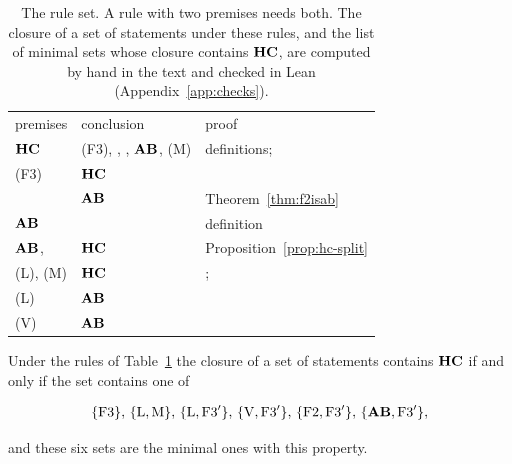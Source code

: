 \begin{table}[t]
\centering
\caption{The rule set. A rule with two premises needs both. The closure of a set of statements under these rules, and the list of minimal sets whose closure contains $\mathbf{HC}$, are computed by hand in the text and checked in Lean (Appendix~\ref{app:checks}).}
\label{tab:rules}
\begin{ruledtabular}
\begin{tabular}{lll}
premises & conclusion & proof \\
\colrule
$\mathbf{HC}$ & (F3), \Fii{}, \Fiii{}, $\mathbf{AB}$, (M) & definitions; \cite{And96b} \\
(F3) & $\mathbf{HC}$ & \cite[Prop.~20.33]{BMB26} \\
\Fii{} & $\mathbf{AB}$ & Theorem~\ref{thm:f2isab} \\
$\mathbf{AB}$ & \Fii{} & definition \\
$\mathbf{AB}$, \Fiii{} & $\mathbf{HC}$ & Proposition~\ref{prop:hc-split} \\
(L), (M) & $\mathbf{HC}$ & \cite{And96b}; \cite[Thm.~20.70]{BMB26} \\
(L) & $\mathbf{AB}$ & \cite[Thm.~20.70]{BMB26} \\
(V) & $\mathbf{AB}$ & \cite[Thm.~20.70]{BMB26} \\
\end{tabular}
\end{ruledtabular}
\end{table}

\begin{proposition}\label{prop:minimal}
Under the rules of Table~\ref{tab:rules} the closure of a set of statements contains $\mathbf{HC}$ if and only if the set contains one of
\begin{widetext}
\begin{equation}\label{eq:minimal}
\{\mathrm{F3}\},\,\{\mathrm{L},\mathrm{M}\},\,\{\mathrm{L},\mathrm{F3}'\},\,\{\mathrm{V},\mathrm{F3}'\},\,\{\mathrm{F2},\mathrm{F3}'\},\,\{\mathbf{AB},\mathrm{F3}'\},
\end{equation}
\end{widetext}
and these six sets are the minimal ones with this property.
\end{proposition}

